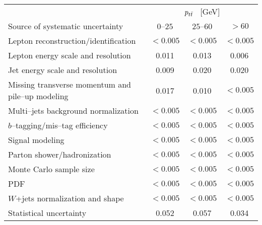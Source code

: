 \begin{table}[!htbp]\centering
\begin{tabular}{l c c c}
\toprule
 &\multicolumn{3}{c}{$p_{t\bar{t}}{}$ ~[GeV]} \\
Source of systematic uncertainty           &    $0$--$25$           &        $25$--$60$         &  $>60$    \\
\midrule
Lepton reconstruction/identification              & $<0.005$ & $<0.005$ & $<0.005$ \\
Lepton energy scale and resolution                & 0.011 & 0.013 & 0.006   \\
Jet energy scale and resolution                   & 0.009 & 0.020 & 0.020   \\
Missing transverse momentum and pile--up modeling & 0.017 & 0.010 & $<0.005$ \\
Multi--jets background normalization    & $<0.005$ & $<0.005$ & $<0.005$  \\
$b$--tagging/mis--tag efficiency                & $<0.005$ & $<0.005$ & $<0.005$  \\
Signal modeling                        & $<0.005$ & $<0.005$ & $<0.005$  \\
Parton shower/hadronization             & $<0.005$ & $<0.005$ & $<0.005$  \\
Monte Carlo sample size                 & $<0.005$ & $<0.005$ & $<0.005$  \\
PDF                                     & $<0.005$ & $<0.005$ & $<0.005$  \\
$W$+jets normalization and shape        & $<0.005$ & $<0.005$ & $<0.005$  \\
\midrule
Statistical uncertainty                 & 0.052                &        0.057      &        0.034     \\
\bottomrule
\end{tabular}
\caption{}
\label{table:Systematics_pttt}
\end{table}

